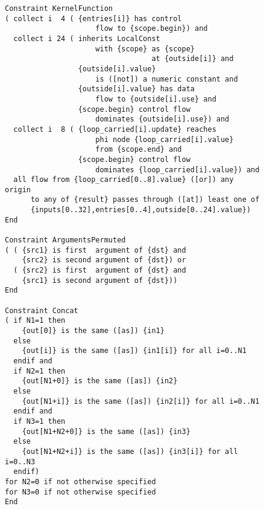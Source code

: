\begin{figure}[p]
\begin{lstlisting}[language=IDL,basicstyle=\linespread{0.8}\ttfamily,
                   firstnumber=189]
Constraint KernelFunction
( collect i  4 ( {entries[i]} has control
                     flow to {scope.begin}) and
  collect i 24 ( inherits LocalConst
                     with {scope} as {scope}
                                  at {outside[i]} and
                 {outside[i].value}
                     is ([not]) a numeric constant and
                 {outside[i].value} has data
                     flow to {outside[i].use} and
                 {scope.begin} control flow
                     dominates {outside[i].use}) and
  collect i  8 ( {loop_carried[i].update} reaches
                     phi node {loop_carried[i].value}
                     from {scope.end} and
                 {scope.begin} control flow
                     dominates {loop_carried[i].value}) and
  all flow from {loop_carried[0..8].value} ([or]) any origin
      to any of {result} passes through ([at]) least one of
      {inputs[0..32],entries[0..4],outside[0..24].value})
End

Constraint ArgumentsPermuted
( ( {src1} is first  argument of {dst} and
    {src2} is second argument of {dst}) or
  ( {src2} is first  argument of {dst} and
    {src1} is second argument of {dst}))
End

Constraint Concat
( if N1=1 then
    {out[0]} is the same ([as]) {in1}
  else
    {out[i]} is the same ([as]) {in1[i]} for all i=0..N1
  endif and
  if N2=1 then
    {out[N1+0]} is the same ([as]) {in2}
  else
    {out[N1+i]} is the same ([as]) {in2[i]} for all i=0..N1
  endif and
  if N3=1 then
    {out[N1+N2+0]} is the same ([as]) {in3}
  else
    {out[N1+N2+i]} is the same ([as]) {in3[i]} for all i=0..N3
  endif)
for N2=0 if not otherwise specified
for N3=0 if not otherwise specified
End
\end{lstlisting}
\end{figure}